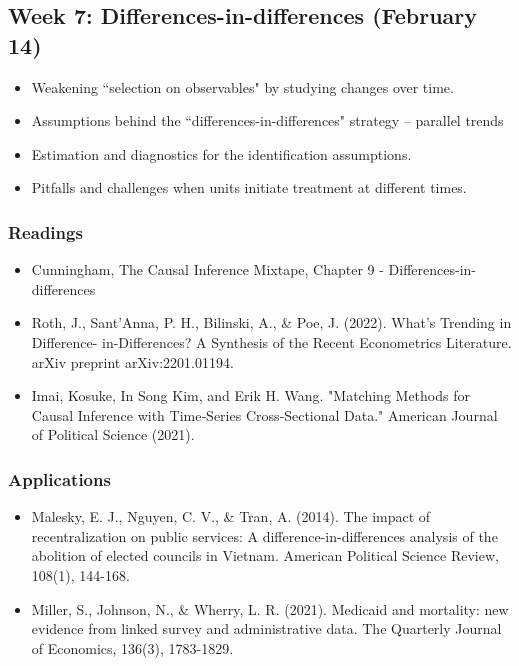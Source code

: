 \documentclass[11pt, article, oneside]{memoir}
\theoremstyle{Assumption}
\begin{document}
\subsection{Week 7: Differences-in-differences (February 14)}

\begin{itemize}
\item Weakening ``selection on observables" by studying changes over time. 
\item Assumptions behind the ``differences-in-differences" strategy -- parallel trends
\item Estimation and diagnostics for the identification assumptions.
\item Pitfalls and challenges when units initiate treatment at different times. 
\end{itemize}

\subsubsection*{Readings}

\begin{itemize}
\item Cunningham, The Causal Inference Mixtape, Chapter 9 - Differences-in-differences
\item Roth, J., Sant'Anna, P. H., Bilinski, A., \& Poe, J. (2022). What's Trending in Difference- in-Differences? A Synthesis of the Recent Econometrics Literature. arXiv preprint arXiv:2201.01194.
\item Imai, Kosuke, In Song Kim, and Erik H. Wang. "Matching Methods for Causal Inference with Time‐Series Cross‐Sectional Data." American Journal of Political Science (2021).
\end{itemize}

\subsubsection*{Applications}

\begin{itemize}
\item Malesky, E. J., Nguyen, C. V., \& Tran, A. (2014). The impact of recentralization on public services: A difference-in-differences analysis of the abolition of elected councils in Vietnam. American Political Science Review, 108(1), 144-168.
\item Miller, S., Johnson, N., \& Wherry, L. R. (2021). Medicaid and mortality: new evidence from linked survey and administrative data. The Quarterly Journal of Economics, 136(3), 1783-1829.
\end{itemize}
\end{document}
